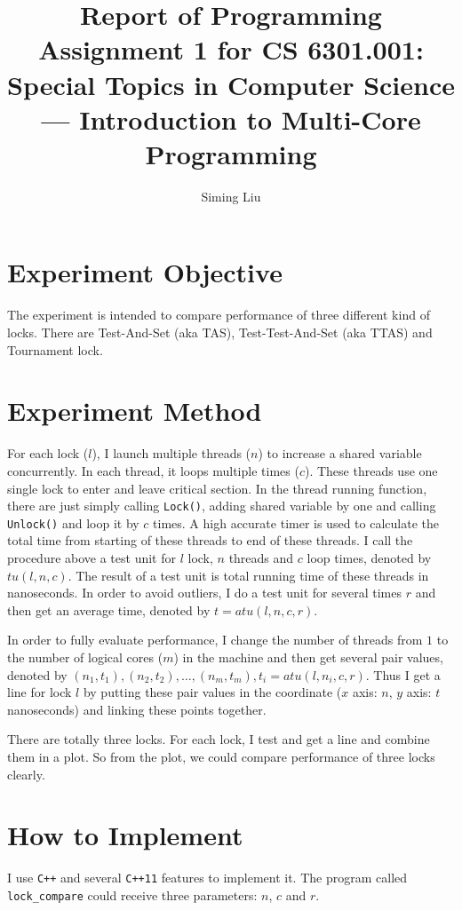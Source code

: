 \documentclass[a4paper]{report}
\begin{document}
\title{Report of Programming Assignment 1 for CS 6301.001: Special Topics in Computer Science --- Introduction to Multi-Core Programming}

\author{Siming Liu}

\maketitle{}

\section*{Experiment Objective}
The experiment is intended to compare performance of three different kind of locks. There are Test-And-Set (aka TAS), Test-Test-And-Set (aka TTAS) and Tournament lock.

\section*{Experiment Method}
For each lock ($l$), I launch multiple threads ($n$) to increase a shared variable concurrently.
In each thread, it loops multiple times ($c$).
These threads use one single lock to enter and leave critical section. In the thread running function, there are just simply calling \lstinline{Lock()}, adding shared variable by one and calling \lstinline{Unlock()} and loop it by $c$ times.
A high accurate timer is used to calculate the total time from starting of these threads to end of these threads.
I call the procedure above a test unit for $l$ lock, $n$ threads and $c$ loop times, denoted by $tu(l, n, c)$.
The result of a test unit is total running time of these threads in nanoseconds.
In order to avoid outliers, I do a test unit for several times $r$ and then get an average time, denoted by $t = atu(l, n, c, r)$.

In order to fully evaluate performance, I change the number of threads from $1$ to the number of logical cores ($m$) in the machine and then get several pair values, denoted by $(n_1, t_1), (n_2, t_2), \ldots, (n_m, t_m), t_i = atu(l, n_i, c, r)$. Thus I get a line for lock $l$ by putting these pair values in the coordinate ($x$ axis: $n$, $y$ axis: $t$ nanoseconds) and linking these points together.

There are totally three locks.
For each lock, I test and get a line and combine them in a plot.
So from the plot, we could compare performance of three locks clearly.

\section*{How to Implement}
I use \lstinline{C++} and several \lstinline{C++11} features to implement it.
The program called \lstinline{lock_compare} could receive three parameters: $n$, $c$ and $r$.
\end{document}
